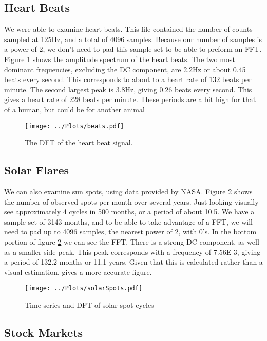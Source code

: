 \documentclass[twocolumn]{myarticle}
\begin{document}
\subsection{Heart Beats}

We were able to examine heart beats. 
This file contained the number of counts sampled at 125Hz, and a total of 4096 samples. 
Because our number of samples is a power of 2, we don't need to pad this sample set to be able to preform an FFT. 
Figure \ref{fig:heart_beat} shows the amplitude spectrum of the heart beats. 
The two most dominant frequencies, excluding the DC component, are 2.2Hz or about 0.45 beats every second. 
This corresponds to about to a heart rate of 132 beats per minute. 
The second largest peak is 3.8Hz, giving 0.26 beats every second. 
This gives a heart rate of 228 beats per minute. 
These periods are a bit high for that of a human, but could be for another animal
\begin{figure}[ht]
    \centering
    \texttt{[image: ../Plots/beats.pdf]}
    \caption{The DFT of the heart beat signal.}
    \label{fig:heart_beat}
\end{figure}

\subsection{Solar Flares}
We can also examine sun spots, using data provided by NASA. 
Figure \ref{fig:solar_spots} shows the number of observed spots per month over several years. 
Just looking visually see approximately 4 cycles in 500 months, or a period of about 10.5. 
We have a sample set of 3143 months, and to be able to take advantage of a FFT, we will need to pad up to 4096 samples, the nearest power of 2, with 0's. 
In the bottom portion of figure \ref{fig:solar_spots} we can see the FFT. 
There is a strong DC component, as well as a smaller side peak. 
This peak corresponds with a frequency of 7.56E-3, giving a period of 132.2 months or 11.1 years. 
Given that this is calculated rather than a visual estimation, gives a more accurate figure.

\begin{figure}[ht]
    \centering
    \texttt{[image: ../Plots/solarSpots.pdf]}
    \caption{Time series and DFT of solar spot cycles}
    \label{fig:solar_spots}
\end{figure}

\subsection{Stock Markets}
\end{document}
